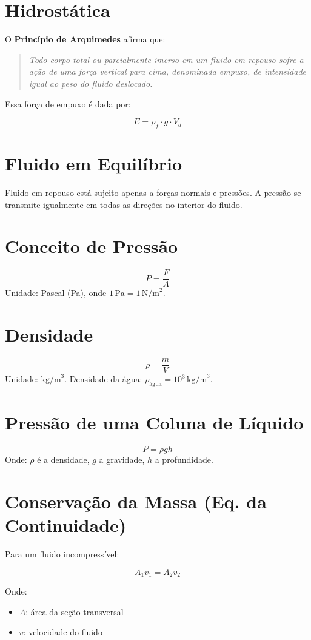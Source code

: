 \documentclass[a4paper,12pt]{article}
\begin{document}
\begin{multicols}{2}
\section{Hidrostática}

O \textbf{Princípio de Arquimedes} afirma que:

\begin{quote}
    \textit{Todo corpo total ou parcialmente imerso em um fluido em repouso sofre a ação de uma 
    força vertical para cima, denominada empuxo, de intensidade igual ao peso do fluido deslocado.}
\end{quote}

Essa força de empuxo é dada por:

\[
\boxed{
E = \rho_f \cdot g \cdot V_d
}
\]

\section{Fluido em Equilíbrio}
Fluido em repouso está sujeito apenas a forças normais e pressões. A pressão se transmite igualmente em todas as direções no interior do fluido.

\section{Conceito de Pressão}
\[
P = \frac{F}{A}
\]
Unidade: Pascal (Pa), onde \(1\, \text{Pa} = 1\, \text{N/m}^2\).

\section{Densidade}
\[
\rho = \frac{m}{V}
\]
Unidade: \(\text{kg/m}^3\). Densidade da água: \(\rho_{\text{água}} = 10^3\, \text{kg/m}^3\).

\section{Pressão de uma Coluna de Líquido}
\[
P = \rho g h
\]
Onde: \(\rho\) é a densidade, \(g\) a gravidade, \(h\) a profundidade.

\section{Conservação da Massa (Eq. da Continuidade)}

Para um fluido incompressível:

\[
A_1 v_1 = A_2 v_2
\]

Onde:
\begin{itemize}
  \item \( A \): área da seção transversal
  \item \( v \): velocidade do fluido
\end{itemize}


\end{multicols}
\end{document}
